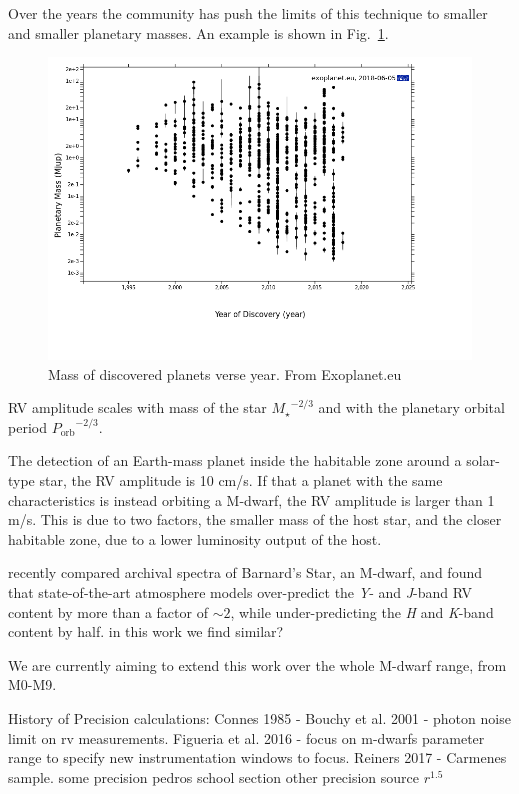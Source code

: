 Over the years the community has push the limits of this technique to smaller and smaller planetary masses. An example is shown in Fig.~\ref{fig:year_mass}.
\begin{figure}

\includegraphics[width=0.8\linewidth]{figures/year_planet_mass.png}
\caption{Mass of discovered planets verse year. From Exoplanet.eu}
\label{fig:year_mass}
\end{figure}


RV amplitude scales with mass of the star \({M_{\star}}^{-2/3}\) and with the planetary orbital period \({P_{\textrm{orb}}}^{-2/3}\).

The detection of an Earth-mass planet inside the habitable zone around a solar-type star, the RV amplitude is 10 cm/s. If that a planet with the same characteristics is instead orbiting a M-dwarf, the RV amplitude is larger than 1 m/s. This is due to two factors, the smaller mass of the host star, and the closer habitable zone, due to a lower luminosity output of the host.

\citet{artigau_optical_2018} recently compared archival spectra of Barnard's Star, an M-dwarf, and found that state-of-the-art atmosphere models over-predict the \emph{Y}- and \emph{J}-band RV content by more than a factor of \(\sim 2\), while under-predicting the \emph{H} and \emph{K}-band content by half.
{\red{} in this work we find similar?}

We are currently aiming to extend this work over the whole M-dwarf range, from M0-M9.


History of Precision calculations:
Connes 1985 -
Bouchy et al. 2001  - photon noise limit on rv measurements.
Figueria et al. 2016 - focus on m-dwarfs parameter range to specify new instrumentation windows to focus.
Reiners 2017 -  Carmenes sample. some precision
pedros school section other precision source \(r^1.5\)


